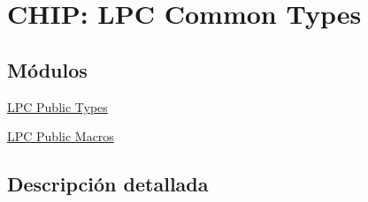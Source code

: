 \hypertarget{group___l_p_c___types}{}\section{C\+H\+IP\+: L\+PC Common Types}
\label{group___l_p_c___types}
\subsection*{Módulos}
\begin{DoxyCompactItemize}
\item 
\hyperlink{group___l_p_c___types___public___types}{L\+P\+C Public Types}
\item 
\hyperlink{group___l_p_c___types___public___macros}{L\+P\+C Public Macros}
\end{DoxyCompactItemize}


\subsection{Descripción detallada}
